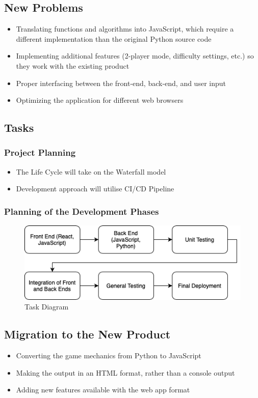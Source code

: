 \documentclass[12pt, titlepage]{article}
\begin{document}
\subsection{New Problems}
\begin{itemize}
    \item Translating functions and algorithms into JavaScript, which require a different implementation than the original Python source code
    \item Implementing additional features (2-player mode, difficulty settings, etc.) so they work with the existing product
    \item Proper interfacing between the front-end, back-end, and user input
    \item Optimizing the application for different web browsers
\end{itemize}

\subsection{Tasks}
\subsubsection{Project Planning}
\begin{itemize}
    \item The Life Cycle will take on the Waterfall model
    \item Development approach will utilise CI/CD Pipeline
\end{itemize}
\subsubsection{Planning of the Development Phases}
\begin{figure}[H]
    \caption{Task Diagram}
    \centering
    \includegraphics[width=0.95\linewidth]{task.png}
    \end{figure}

\subsection{Migration to the New Product}
\begin{itemize}
    \item Converting the game mechanics from Python to JavaScript
    \item Making the output in an HTML format, rather than a console output
    \item Adding new features available with the web app format
\end{itemize}
\end{document}
